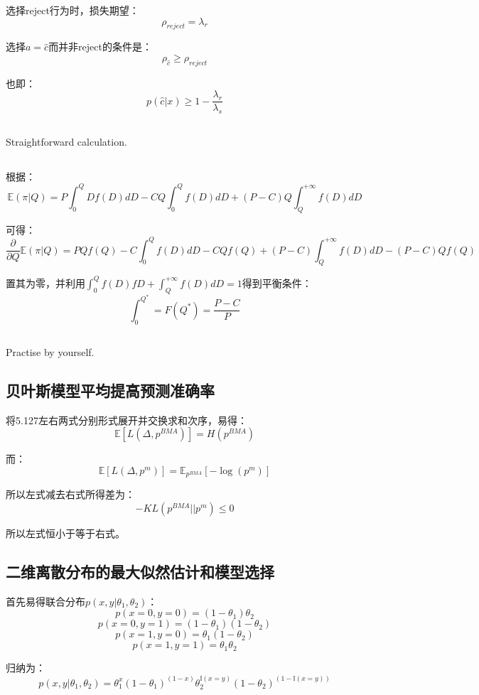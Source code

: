 \documentclass[UTF8]{ctexart}
\begin{document}
选择reject行为时，损失期望：
$$\rho_{reject} = \lambda_{r}$$

选择$a=\hat{c}$而并非reject的条件是：
$$\rho_{\hat{c}} \geq \rho_{reject}$$

也即：
$$p(\hat{c}|x) \geq 1-\frac{\lambda_{r}}{\lambda_{s}}$$

\subsection{}
Straightforward calculation.

\subsection{}
根据：
$$\mathbb{E}(\pi|Q)=P\int_{0}^{Q}Df(D)dD-CQ\int_{0}^{Q}f(D)dD+(P-C)Q\int_{Q}^{+\infty}f(D)dD$$

可得：
$$\frac{\partial}{\partial Q}\mathbb{E}(\pi|Q) = PQf(Q)-C\int_{0}^{Q}f(D)dD-CQf(Q)+(P-C)\int_{Q}^{+\infty}f(D)dD-(P-C)Qf(Q)$$

置其为零，并利用$\int_{0}^{Q}f(D)fD + \int_{Q}^{+\infty}f(D)dD=1$得到平衡条件：
$$\int_{0}^{Q^{*}}=F(Q^{*})=\frac{P-C}{P}$$

\subsection{}
Practise by yourself.

\subsection{贝叶斯模型平均提高预测准确率}
将5.127左右两式分别形式展开并交换求和次序，易得：
$$\mathbb{E}[L(\Delta,p^{BMA})]=H(p^{BMA})$$

而：
$$\mathbb{E}[L(\Delta,p^{m})]=\mathbb{E}_{p^{BMA}}[-\log(p^{m})]$$

所以左式减去右式所得差为：
$$-KL(p^{BMA}||p^{m}) \leq 0$$

所以左式恒小于等于右式。

\subsection{二维离散分布的最大似然估计和模型选择}
首先易得联合分布$p(x,y|\theta_{1},\theta_{2})$：
$$p(x=0,y=0)=(1-\theta_{1})\theta_{2}$$
$$p(x=0,y=1)=(1-\theta_{1})(1-\theta_{2})$$
$$p(x=1,y=0)=\theta_{1}(1-\theta_{2})$$
$$p(x=1,y=1)=\theta_{1}\theta_{2}$$

归纳为：
$$p(x,y|\theta_{1},\theta_{2})=\theta_{1}^{x}(1-\theta_{1})^{(1-x)}\theta_{2}^{\mathbb{I}(x=y)}(1-\theta_{2})^{(1-\mathbb{I}(x=y))}$$
\end{document}
